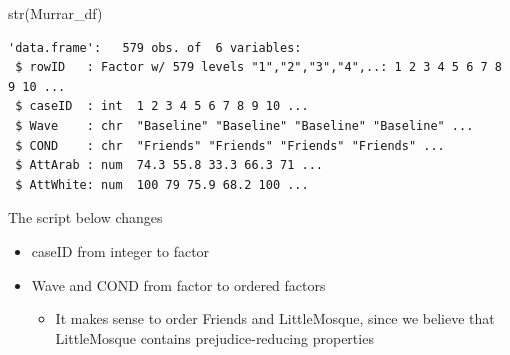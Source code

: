 \documentclass[
  11pt,
]{book}
\newenvironment{Shaded}{\begin{snugshade}}{\end{snugshade}}
\newcommand{\AttributeTok}[1]{\textcolor[rgb]{0.77,0.63,0.00}{#1}}
\newcommand{\CommentTok}[1]{\textcolor[rgb]{0.56,0.35,0.01}{\textit{#1}}}
\newcommand{\FunctionTok}[1]{\textcolor[rgb]{0.00,0.00,0.00}{#1}}
\newcommand{\NormalTok}[1]{#1}
\newcommand{\OtherTok}[1]{\textcolor[rgb]{0.56,0.35,0.01}{#1}}
\newcommand{\SpecialCharTok}[1]{\textcolor[rgb]{0.00,0.00,0.00}{#1}}
\newcommand{\StringTok}[1]{\textcolor[rgb]{0.31,0.60,0.02}{#1}}
\providecommand{\tightlist}{%
  \setlength{\itemsep}{0pt}\setlength{\parskip}{0pt}}
\begin{document}
\begin{Shaded}
\begin{Highlighting}[]
\FunctionTok{str}\NormalTok{(Murrar\_df)}
\end{Highlighting}
\end{Shaded}

\begin{verbatim}
'data.frame':   579 obs. of  6 variables:
 $ rowID   : Factor w/ 579 levels "1","2","3","4",..: 1 2 3 4 5 6 7 8 9 10 ...
 $ caseID  : int  1 2 3 4 5 6 7 8 9 10 ...
 $ Wave    : chr  "Baseline" "Baseline" "Baseline" "Baseline" ...
 $ COND    : chr  "Friends" "Friends" "Friends" "Friends" ...
 $ AttArab : num  74.3 55.8 33.3 66.3 71 ...
 $ AttWhite: num  100 79 75.9 68.2 100 ...
\end{verbatim}

The script below changes

\begin{itemize}
\tightlist
\item
  caseID from integer to factor
\item
  Wave and COND from factor to ordered factors

  \begin{itemize}
  \tightlist
  \item
    It makes sense to order Friends and LittleMosque, since we believe that LittleMosque contains prejudice-reducing properties
  \end{itemize}
\end{itemize}

\begin{Shaded}
\end{Shaded}
\end{document}
